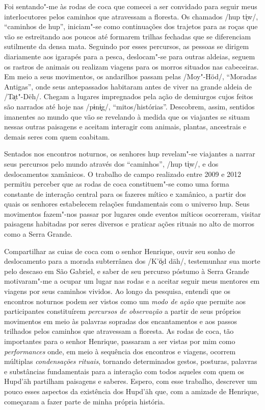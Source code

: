 Foi sentando"-me às rodas de coca que comecei a ser convidado para seguir
meus interlocutores pelos caminhos que atravessam a floresta. Os
chamados /hup ti̖w/, ``caminhos de hup'', iniciam"-se como continuações
dos trajetos para as roças que vão se estreitando aos poucos até
formarem trilhas fechadas que se diferenciam sutilmente da densa mata.
Seguindo por esses percursos, as pessoas se dirigem diariamente aos
igarapés para a pesca, deslocam"-se para outras aldeias, seguem os
rastros de animais ou realizam viagens para os morros situados nas
cabeceiras. Em meio a seus movimentos, os andarilhos passam pelas
/Moy"-Höd/, ``Moradas Antigas'', onde seus antepassados habitaram antes
de viver na grande aldeia de /Ta̗t"-Dëh/. Chegam a lugares impregnados
pela ação de demiurgos cujos feitos são narrados até hoje nas /pɨnɨ̖g/,
``mitos/histórias''. Descobrem, assim, sentidos imanentes ao mundo que
vão se revelando à medida que os viajantes se situam nessas outras
paisagens e aceitam interagir com animais, plantas, ancestrais e demais
seres com quem coabitam.

Sentados nos encontros noturnos, os senhores hup revelam"-se viajantes a
narrar seus percursos pelo mundo através dos ``caminhos'', /hup ti̖w/, e
dos deslocamentos xamânicos. O trabalho de campo realizado entre 2009 e
2012 permitiu perceber que as rodas de coca constituem"-se como uma forma
constante de interação central para os fazeres mítico e xamânico, a
partir dos quais os senhores estabelecem relações fundamentais com o
universo hup. Seus movimentos fazem"-nos passar por lugares onde eventos
míticos ocorreram, visitar paisagens habitadas por seres diversos e
praticar ações rituais no alto de morros como a Serra Grande.

Compartilhar as cuias de coca com o senhor Henrique, ouvir seu sonho de
deslocamento para a morada subterrânea dos /K'ö̗d däh/, testemunhar sua
morte pelo descaso em São Gabriel, e saber de seu percurso póstumo à
Serra Grande motivaram"-me a ocupar um lugar nas rodas e a aceitar seguir
meus mentores em viagens por seus caminhos vividos. Ao longo da
pesquisa, entendi que os encontros noturnos podem ser vistos como um
\emph{modo de ação} que permite aos participantes constituírem
\emph{percursos de observação} a partir de seus próprios movimentos em
meio às palavras sopradas dos encantamentos e aos passos trilhados pelos
caminhos que atravessam a floresta. As rodas de coca, tão importantes
para o senhor Henrique, passaram a ser vistas por mim como
\emph{performances} onde, em meio à sequência dos encontros e viagens,
ocorrem múltiplas \emph{condensações rituais}, tornando determinados
gestos, posturas, palavras e substâncias fundamentais para a interação
com todos aqueles com quem os Hupd'äh partilham paisagens e saberes.
Espero, com esse trabalho, descrever um pouco esses aspectos da
existência dos Hupd'äh que, com a amizade de Henrique, começaram a fazer
parte de minha própria história.

